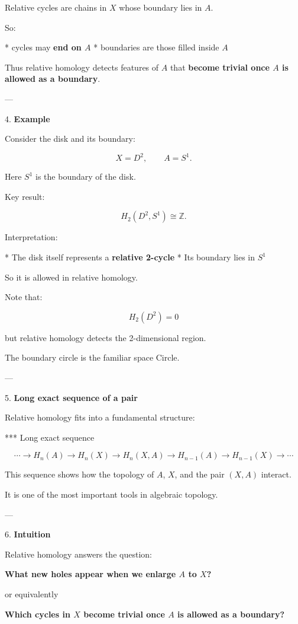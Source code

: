 \documentclass[12pt,a4paper]{report}
\begin{document}
\begin{description}
\begin{description}
Relative cycles are chains in $X$ whose boundary lies in $A$.

So:

* cycles may \textbf{end on $A$}
* boundaries are those filled inside $A$

Thus relative homology detects features of $A$ that \textbf{become trivial once $A$ is allowed as a boundary}.

---

\item 4. \textbf{Example}

Consider the disk and its boundary:

$$ X = D^2, \qquad A = S^1.  $$

Here $S^1$ is the boundary of the disk.

Key result:

$$ H_2(D^2,S^1) \cong \mathbb{Z}.  $$

Interpretation:

* The disk itself represents a \textbf{relative 2-cycle}
* Its boundary lies in $S^1$

So it is allowed in relative homology.

Note that:

$$ H_2(D^2)=0 $$

but relative homology detects the 2-dimensional region.

The boundary circle is the familiar space Circle.

---

\item 5. \textbf{Long exact sequence of a pair}

Relative homology fits into a fundamental structure:

*** Long exact sequence

$$ \cdots \to H_n(A) \to H_n(X) \to H_n(X,A) \to H_{n-1}(A) \to H_{n-1}(X) \to \cdots $$

This sequence shows how the topology of $A$, $X$, and the pair $(X,A)$ interact.

It is one of the most important tools in algebraic topology.

---

\item 6. \textbf{Intuition}

Relative homology answers the question:

 \textbf{What new holes appear when we enlarge $A$ to $X$?}

or equivalently

 \textbf{Which cycles in $X$ become trivial once $A$ is allowed as a boundary?}


\end{description}
\end{description}
\end{document}
